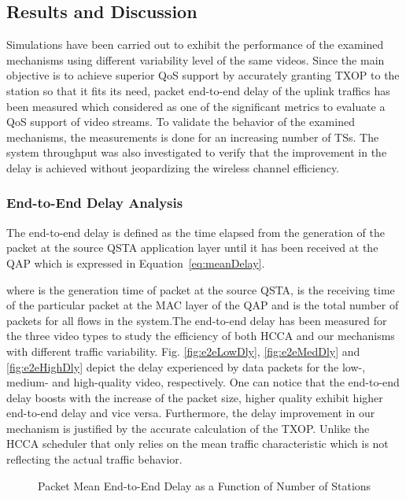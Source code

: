 \documentclass[a4paper, conference]{IEEEtran}
\begin{document}
\subsection{Results and Discussion}
Simulations have been carried out to exhibit the performance of the examined mechanisms using different variability level of the same videos. Since the main objective is to achieve superior QoS support by accurately granting TXOP to the station so that it fits its need, packet end-to-end delay of the uplink traffics has been measured which considered as one of the significant metrics to evaluate a QoS support of video streams. To validate the behavior of the examined mechanisms, the measurements is done for an increasing number of TSs. The system throughput was also investigated to verify that the improvement in the delay is achieved without jeopardizing the wireless channel efficiency.

\subsubsection{End-to-End Delay Analysis}
The end-to-end delay is defined as the time elapsed from the generation of the packet at the source QSTA application layer until it has been received at the QAP which is expressed in Equation~\eqref{eq:meanDelay}.

where  is the generation time of packet  at the source QSTA,  is the receiving time of the particular packet at the MAC layer of the QAP and  is the total number of packets for all flows in the system.The end-to-end delay has been measured for the three video types to study the efficiency of  both HCCA and our mechanisms with different traffic variability. Fig. \ref{fig:e2eLowDly}, \ref{fig:e2eMedDly} and \ref{fig:e2eHighDly} depict the delay experienced by data packets for the low-, medium- and high-quality video, respectively. One can notice that the end-to-end delay boosts with the increase of the packet size, higher quality exhibit higher end-to-end delay and vice versa. Furthermore, the delay improvement in our mechanism is justified by the accurate calculation of the TXOP. Unlike the HCCA scheduler that only relies on the mean traffic characteristic which is not reflecting the actual traffic behavior.
\begin{figure}[t]
\centering
{}
\caption{Packet Mean End-to-End Delay as a Function of Number of Stations}
\label{fig:accessDly}
\end{figure}
\end{document}
